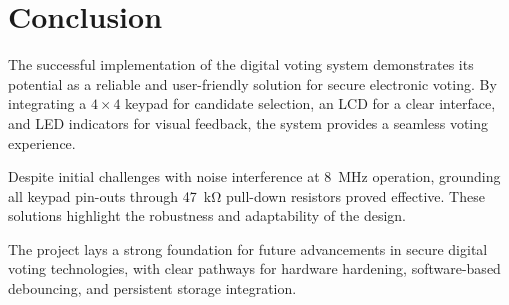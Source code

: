 \documentclass[11pt, a4paper]{report}
\begin{document}
\chapter{Conclusion}

The successful implementation of the digital voting system demonstrates its
potential as a reliable and user-friendly solution for secure electronic
voting. By integrating a \(4 \times 4\) keypad for candidate selection, an
LCD for a clear interface, and LED indicators for visual feedback, the system
provides a seamless voting experience.

Despite initial challenges with noise interference at \SI{8}{MHz} operation,
grounding all keypad pin-outs through \SI{47}{\kilo\ohm} pull-down resistors
proved effective. These solutions highlight the robustness and adaptability of
the design.

The project lays a strong foundation for future advancements in secure digital
voting technologies, with clear pathways for hardware hardening,
software-based debouncing, and persistent storage integration.
\end{document}
